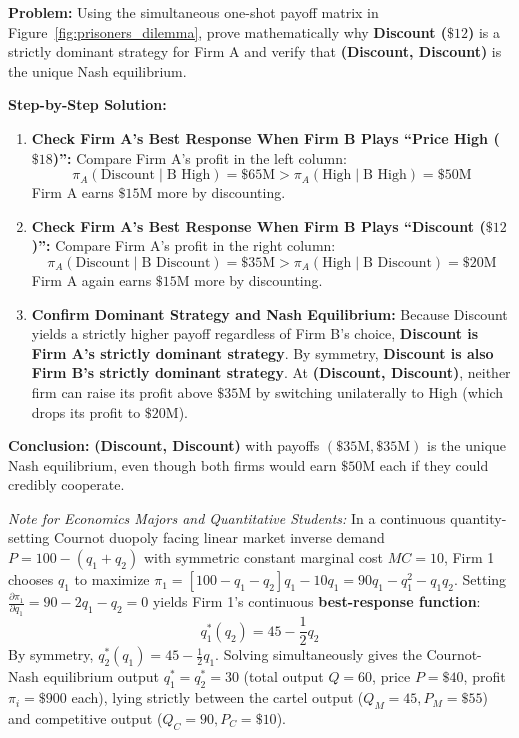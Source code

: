 \documentclass[11pt,letterpaper]{article}
\begin{document}
\begin{tcolorbox}[colback=LightSlate,colframe=CourseTeal,title=\textbf{Work It Out: Solving a Simultaneous Pricing Game}]
\noindent\textbf{Problem:}
Using the simultaneous one-shot payoff matrix in Figure~\ref{fig:prisoners_dilemma}, prove mathematically why \textbf{Discount ($\$12$)} is a strictly dominant strategy for Firm A and verify that \textbf{(Discount, Discount)} is the unique Nash equilibrium.

\noindent\textbf{Step-by-Step Solution:}
\begin{enumerate}
    \item \textbf{Check Firm A's Best Response When Firm B Plays ``Price High ($\$18$)'':}
    Compare Firm A's profit in the left column:
    \[
    \pi_A(\text{Discount} \mid \text{B High}) = \$65\text{M} > \pi_A(\text{High} \mid \text{B High}) = \$50\text{M}
    \]
    Firm A earns $\$15\text{M}$ more by discounting.

    \item \textbf{Check Firm A's Best Response When Firm B Plays ``Discount ($\$12$)'':}
    Compare Firm A's profit in the right column:
    \[
    \pi_A(\text{Discount} \mid \text{B Discount}) = \$35\text{M} > \pi_A(\text{High} \mid \text{B Discount}) = \$20\text{M}
    \]
    Firm A again earns $\$15\text{M}$ more by discounting.

    \item \textbf{Confirm Dominant Strategy and Nash Equilibrium:}
    Because Discount yields a strictly higher payoff regardless of Firm B's choice, \textbf{Discount is Firm A's strictly dominant strategy}. By symmetry, \textbf{Discount is also Firm B's strictly dominant strategy}. At \textbf{(Discount, Discount)}, neither firm can raise its profit above $\$35\text{M}$ by switching unilaterally to High (which drops its profit to $\$20\text{M}$).
\end{enumerate}
\textbf{Conclusion:} \textbf{(Discount, Discount)} with payoffs $(\$35\text{M}, \$35\text{M})$ is the unique Nash equilibrium, even though both firms would earn $\$50\text{M}$ each if they could credibly cooperate.
\end{tcolorbox}

\begin{tcolorbox}[colback=LightSlate,colframe=CourseBlue,title=\textbf{Optional Advanced Section: Cournot Duopoly Best-Response Functions}]
\small
\emph{Note for Economics Majors and Quantitative Students:}
In a continuous quantity-setting Cournot duopoly facing linear market inverse demand $P = 100 - (q_1 + q_2)$ with symmetric constant marginal cost $MC = 10$, Firm 1 chooses $q_1$ to maximize $\pi_1 = [100 - q_1 - q_2]q_1 - 10q_1 = 90q_1 - q_1^2 - q_1 q_2$. Setting $\frac{\partial \pi_1}{\partial q_1} = 90 - 2q_1 - q_2 = 0$ yields Firm 1's continuous \textbf{best-response function}:
\[
q_1^*(q_2) = 45 - \frac{1}{2}q_2
\]
By symmetry, $q_2^*(q_1) = 45 - \frac{1}{2}q_1$. Solving simultaneously gives the Cournot-Nash equilibrium output $q_1^* = q_2^* = 30$ (total output $Q = 60$, price $P = \$40$, profit $\pi_i = \$900$ each), lying strictly between the cartel output ($Q_M = 45, P_M = \$55$) and competitive output ($Q_C = 90, P_C = \$10$).
\end{tcolorbox}
\end{document}
